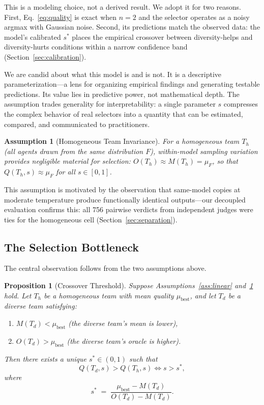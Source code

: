 \documentclass[10pt,twocolumn]{article}
\newtheorem{proposition}{Proposition}
\newtheorem{assumption}{Assumption}
\theoremstyle{remark}
\begin{document}
This is a modeling choice, not a derived result. We adopt it for two reasons. First, Eq.~\eqref{eq:quality} is exact when $n = 2$ and the selector operates as a noisy argmax with Gaussian noise. Second, its predictions match the observed data: the model's calibrated $s^*$ places the empirical crossover between diversity-helps and diversity-hurts conditions within a narrow confidence band (Section~\ref{sec:calibration}).

We are candid about what this model is and is not. It is a descriptive parameterization---a lens for organizing empirical findings and generating testable predictions. Its value lies in predictive power, not mathematical depth. The assumption trades generality for interpretability: a single parameter $s$ compresses the complex behavior of real selectors into a quantity that can be estimated, compared, and communicated to practitioners.

\begin{assumption}[Homogeneous Team Invariance]
\label{ass:homogeneous}
For a homogeneous team $T_h$ (all agents drawn from the same distribution $F$), within-model sampling variation provides negligible material for selection: $O(T_h) \approx M(T_h) = \mu_F$, so that $Q(T_h, s) \approx \mu_F$ for all $s \in [0,1]$.
\end{assumption}

This assumption is motivated by the observation that same-model copies at moderate temperature produce functionally identical outputs---our decoupled evaluation confirms this: all 756 pairwise verdicts from independent judges were ties for the homogeneous cell (Section~\ref{sec:separation}).

\subsection{The Selection Bottleneck}
\label{sec:bottleneck}

The central observation follows from the two assumptions above.

\begin{proposition}[Crossover Threshold]
\label{prop:bottleneck}
Suppose Assumptions~\ref{ass:linear} and~\ref{ass:homogeneous} hold. Let $T_h$ be a homogeneous team with mean quality $\mu_{\mathrm{best}}$, and let $T_d$ be a diverse team satisfying:
\begin{enumerate}[nosep,label=(\roman*)]
  \item $M(T_d) < \mu_{\mathrm{best}}$ \quad (the diverse team's mean is lower),
  \item $O(T_d) > \mu_{\mathrm{best}}$ \quad (the diverse team's oracle is higher).
\end{enumerate}
Then there exists a unique $s^* \in (0,1)$ such that
\[
  Q(T_d, s) > Q(T_h, s) \iff s > s^*,
\]
where
\begin{equation}
s^* \;=\; \frac{\mu_{\mathrm{best}} - M(T_d)}{O(T_d) - M(T_d)}.
\label{eq:threshold}
\end{equation}
\end{proposition}
\end{document}
